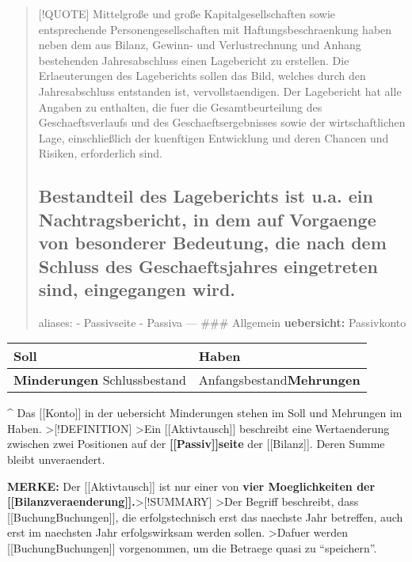 \begin{quote}
{[}!QUOTE{]} Mittelgroße und große Kapitalgesellschaften sowie
entsprechende Personengesellschaften mit Haftungsbeschraenkung haben
neben dem aus Bilanz, Gewinn- und Verlustrechnung und Anhang bestehenden
Jahresabschluss einen Lagebericht zu erstellen. Die Erlaeuterungen des
Lageberichts sollen das Bild, welches durch den Jahresabschluss
entstanden ist, vervollstaendigen. Der Lagebericht hat alle Angaben zu
enthalten, die fuer die Gesamtbeurteilung des Geschaeftsverlaufs und des
Geschaeftsergebnisses sowie der wirtschaftlichen Lage, einschließlich der
kuenftigen Entwicklung und deren Chancen und Risiken, erforderlich sind.

\subsection{Bestandteil des Lageberichts ist u.a. ein Nachtragsbericht,
in dem auf Vorgaenge von besonderer Bedeutung, die nach dem Schluss des
Geschaeftsjahres eingetreten sind, eingegangen
wird.}\label{bestandteil-des-lageberichts-ist-u.a.-ein-nachtragsbericht-in-dem-auf-vorguxe4nge-von-besonderer-bedeutung-die-nach-dem-schluss-des-geschuxe4ftsjahres-eingetreten-sind-eingegangen-wird.}

aliases: - Passivseite - Passiva --- \#\#\# Allgemein
\textbf{uebersicht:} Passivkonto
\end{quote}

\begin{longtable}[]{@{}ll@{}}
\toprule\noalign{}
Soll & Haben \\
\midrule\noalign{}
\endhead
\bottomrule\noalign{}
\endlastfoot
\textbf{Minderungen} Schlussbestand &
Anfangsbestand\textbf{Mehrungen} \\
\end{longtable}

\^{} Das {[}{[}Konto{]}{]} in der uebersicht Minderungen stehen im Soll
und Mehrungen im Haben. \textgreater{[}!DEFINITION{]} \textgreater Ein
{[}{[}Aktivtausch{]}{]} beschreibt eine Wertaenderung zwischen zwei
Positionen auf der \textbf{{[}{[}Passiv{]}{]}seite} der
{[}{[}Bilanz{]}{]}. Deren Summe bleibt unveraendert.

\textbf{MERKE:} Der {[}{[}Aktivtausch{]}{]} ist nur einer von
\textbf{vier Moeglichkeiten der
{[}{[}Bilanzveraenderung{]}{]}.}\textgreater{[}!SUMMARY{]}
\textgreater Der Begriff beschreibt, dass
{[}{[}Buchung\textbar Buchungen{]}{]}, die erfolgstechnisch erst das
naechste Jahr betreffen, auch erst im naechsten Jahr erfolgswirksam werden
sollen. \textgreater Dafuer werden {[}{[}Buchung\textbar Buchungen{]}{]}
vorgenommen, um die Betraege quasi zu ``speichern''.


